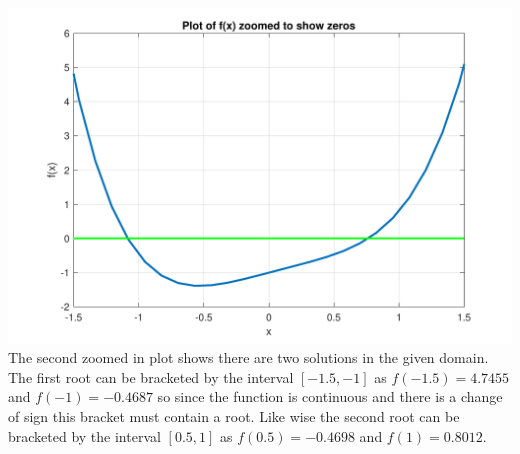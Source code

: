 \documentclass[a4paper,11pt]{article}
\begin{document}
\begin{enumerate}
\begin{enumerate}
{			\includegraphics[scale=0.5]{images/Q1a_i_zoomed.pdf}
		}
			The second zoomed in plot shows there are two solutions in the 
			given 
			domain. The first root can be bracketed by the interval 
			$[-1.5,-1]$ as 
			$f(-1.5)=4.7455$ and $f(-1)=-0.4687$ so since the function is 
			continuous and there is a change of sign this bracket must 
			contain 
			a root. Like wise the second root can be bracketed by the 
			interval $[0.5,1]$ 
			as $f(0.5)=-0.4698$ and $f(1)=0.8012$.
			

\end{enumerate}
\end{enumerate}
\end{document}
